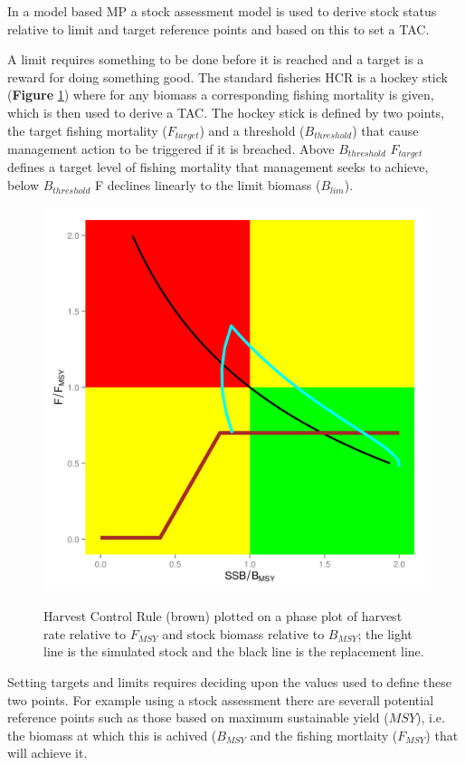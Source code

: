 In a model based MP a stock assessment model is used to derive stock status relative to limit and target reference points and based on this to set a TAC. 

A limit requires something to be done before it is reached and a target is a reward for doing something good. The standard fisheries HCR is a hockey stick (\textbf{Figure} \ref{fig:hcr}) where for any biomass a corresponding fishing mortality is given, which is then used to derive a TAC. The hockey stick is defined by two points, the target fishing mortality ($F_{target}$) and a threshold ($B_{threshold}$)  that cause management action to be triggered if it is breached. Above $B_{threshold}$ $F_{target}$ defines a target level of fishing mortality that management seeks to achieve, below  $B_{threshold}$ F declines linearly to the limit biomass ($B_{lim}$).


\begin{figure}[htbp]
\centering
\includegraphics[width=6in]{../png/hcr.png}
\label{fig:hcr}
\caption{Harvest Control Rule (brown) plotted on a phase plot of harvest rate relative to $F_{MSY}$ and stock biomass relative to $B_{MSY}$;
the light line is the simulated stock and the black line is the replacement line.}
\end{figure}


Setting targets and limits requires deciding upon the values used to define these two points. For example using a stock assessment there are severall potential reference points such as those based on maximum sustainable yield ($MSY$), i.e. the biomass at which this is achived ($B_{MSY}$ and the fishing mortlaity ($F_{MSY}$) that will achieve it.

